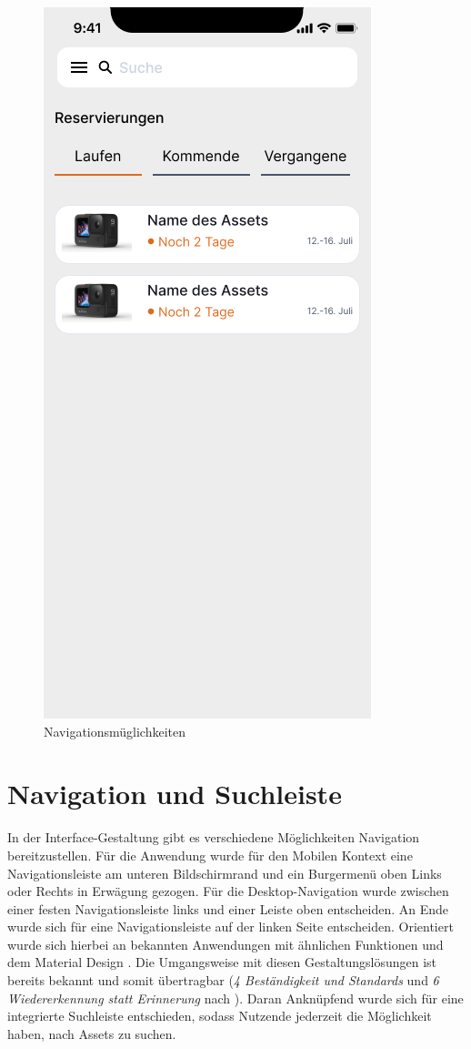 \begin{figure}[h]
    \includegraphics[scale=0.4]{Bilder/Prototyp/Neu/V2.png}
    \caption[Farbpalette]{Navigationsmüglichkeiten}
    \label{fig:home}
\end{figure}

\section{Navigation und Suchleiste}
In der Interface-Gestaltung gibt es verschiedene Möglichkeiten Navigation bereitzustellen. Für die
Anwendung wurde für den Mobilen Kontext eine Navigationsleiste am unteren Bildschirmrand und ein
Burgermenü oben Links oder Rechts in Erwägung gezogen. Für die Desktop-Navigation wurde zwischen
einer festen Navigationsleiste links und einer Leiste oben entscheiden. An Ende wurde sich für eine
Navigationsleiste auf der linken Seite entscheiden. Orientiert wurde sich hierbei an bekannten
Anwendungen mit ähnlichen Funktionen und dem Material Design \cite{google_material_2022}. Die
Umgangsweise mit diesen Gestaltungslösungen ist bereits bekannt und somit übertragbar (\textit{4
Beständigkeit und Standards} und \textit{6 Wiedererkennung statt Erinnerung} nach
). Daran Anknüpfend wurde sich für eine integrierte Suchleiste
entschieden, sodass Nutzende jederzeit die Möglichkeit haben, nach Assets zu suchen.

